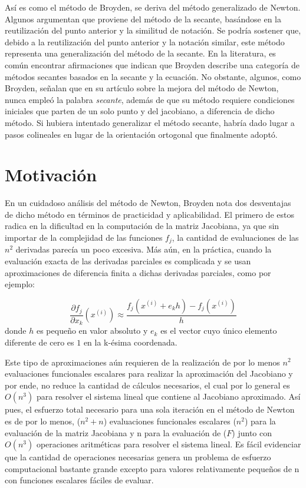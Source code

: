 \documentclass[12pt]{article}
\begin{document}
Así es como el método de Broyden, se deriva del método generalizado de Newton. Algunos argumentan que proviene del método de la secante, basándose en la reutilización del punto anterior y la similitud de notación. Se podría sostener que, debido a la reutilización del punto anterior y la notación similar, este método representa una generalización del método de la secante. En la literatura, es común encontrar afirmaciones que indican que Broyden describe una categoría de métodos secantes basados en la secante y la ecuación. No obstante, algunos, como Broyden, señalan que en su artículo sobre la mejora del método de Newton, nunca empleó la palabra \textit{secante}, además de que su método requiere condiciones iniciales que parten de un solo punto y del jacobiano, a diferencia de dicho método. Si hubiera intentado generalizar el método secante, habría dado lugar a pasos colineales en lugar de la orientación ortogonal que finalmente adoptó.

\section{Motivación}

En un cuidadoso análisis del método de Newton, Broyden nota dos desventajas de dicho método en términos de practicidad y aplicabilidad. El primero de estos radica en la dificultad en la computación de la matriz Jacobiana, ya que sin importar de la complejidad de las funciones $f_j$, la cantidad de evaluaciones de las $n^2$ derivadas parecía un poco excesiva. Más aún, en la práctica,  cuando la evaluación exacta de las derivadas parciales es complicada y se usan aproximaciones de diferencia finita a dichas derivadas parciales, como por ejemplo:

\begin{equation*}
    \frac{\partial f_j}{\partial x_k} (x^{(i)}) \approx \frac{f_j (x^{(i)} + e_k h) - f_j (x^{(i)})}{h}
\end{equation*}
donde $h$ es pequeño en valor absoluto y $e_k$ es el vector cuyo único elemento diferente de cero es $1$ en la k-ésima coordenada.

Este tipo de aproximaciones aún requieren de la realización de por lo menos $n^2$ evaluaciones funcionales escalares para realizar la aproximación del Jacobiano y por ende, no reduce la cantidad de cálculos necesarios, el cual por lo general es $O(n^3)$ para resolver el sistema lineal que contiene al Jacobiano aproximado. Así pues, el esfuerzo total necesario para una sola iteración en el método de Newton es de por lo menos, ($n^2+n$) evaluaciones funcionales escalares ($n^2$) para la evaluación de la matriz Jacobiana y n para la evaluación de ($F$) junto con $O(n^3)$ operaciones aritméticas para resolver el sistema lineal. Es fácil evidenciar que la cantidad de operaciones necesarias genera un problema de esfuerzo computacional bastante grande excepto para valores relativamente pequeños de n con funciones escalares fáciles de evaluar.
\end{document}

